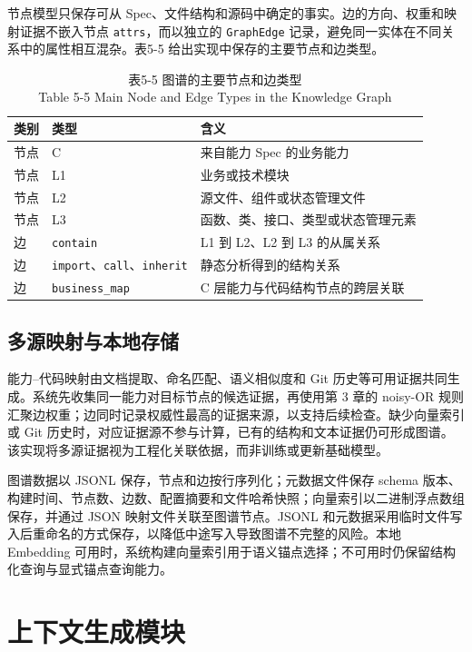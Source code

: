 节点模型只保存可从 Spec、文件结构和源码中确定的事实。边的方向、权重和映射证据不嵌入节点 \texttt{attrs}，而以独立的 \texttt{GraphEdge} 记录，避免同一实体在不同关系中的属性相互混杂。表5-5 给出实现中保存的主要节点和边类型。

\begin{table}[htbp]
\centering
\small
\caption{表5-5 图谱的主要节点和边类型\\Table 5-5 Main Node and Edge Types in the Knowledge Graph}
\begin{tabularx}{\textwidth}{|X|X|X|}
\hline
\textbf{类别} & \textbf{类型} & \textbf{含义} \\
\hline
节点 & C & 来自能力 Spec 的业务能力 \\
节点 & L1 & 业务或技术模块 \\
节点 & L2 & 源文件、组件或状态管理文件 \\
节点 & L3 & 函数、类、接口、类型或状态管理元素 \\
边 & \texttt{contain} & L1 到 L2、L2 到 L3 的从属关系 \\
边 & \texttt{import}、\texttt{call}、\texttt{inherit} & 静态分析得到的结构关系 \\
边 & \texttt{business\_map} & C 层能力与代码结构节点的跨层关联 \\
\hline
\end{tabularx}
\end{table}


\subsection{多源映射与本地存储}
能力--代码映射由文档提取、命名匹配、语义相似度和 Git 历史等可用证据共同生成。系统先收集同一能力对目标节点的候选证据，再使用第 3 章的 noisy-OR 规则汇聚边权重；边同时记录权威性最高的证据来源，以支持后续检查。缺少向量索引或 Git 历史时，对应证据源不参与计算，已有的结构和文本证据仍可形成图谱。该实现将多源证据视为工程化关联依据，而非训练或更新基础模型。

图谱数据以 JSONL 保存，节点和边按行序列化；元数据文件保存 schema 版本、构建时间、节点数、边数、配置摘要和文件哈希快照；向量索引以二进制浮点数组保存，并通过 JSON 映射文件关联至图谱节点。JSONL 和元数据采用临时文件写入后重命名的方式保存，以降低中途写入导致图谱不完整的风险。本地 Embedding 可用时，系统构建向量索引用于语义锚点选择；不可用时仍保留结构化查询与显式锚点查询能力。


\section{上下文生成模块}

